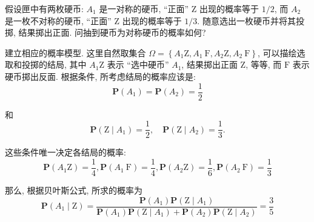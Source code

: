 \begin{example}
    假设匣中有两枚硬币: $A_1$ 是一对称的硬币, “正面” $\mathrm{Z}$ 出现的概率等于 $1 / 2$, 而 $A_2$ 是一枚不对称的硬币, “正面” $\mathrm{Z}$ 出现的概率等于 $1 / 3$. 随意选出一枚硬币并将其投掷, 结果掷出正面. 问抽到硬币为对称硬币的概率如何?
\end{example}

\begin{solution}
    建立相应的概率模型. 这里自然取集合 $\Omega=\left\{A_1 \mathrm{Z}, A_1 \mathrm{~F}, A_2 \mathrm{Z}, A_2 \mathrm{~F}\right\}$, 可以描绘选取和投掷的结局, 其中 $A_1 \mathrm{Z}$ 表示 “选中硬币” $A_1$, 结果掷出正面 $\mathrm{Z}$, 等等, 而 $\mathrm{F}$ 表示硬币掷出反面. 根据条件, 所考虑结局的概率应该是:
$$
\mathbf{P}\left(A_1\right)=\mathbf{P}\left(A_2\right)=\frac{1}{2}
$$

和
$$
\mathbf{P}\left(\mathrm{Z} \mid A_1\right)=\frac{1}{2}, \quad \mathbf{P}\left(\mathrm{Z} \mid A_2\right)=\frac{1}{3} .
$$

这些条件唯一决定各结局的概率:
$$
\mathbf{P}\left(A_1 \mathrm{Z}\right)=\frac{1}{4}, \mathbf{P}\left(A_1 \mathrm{~F}\right)=\frac{1}{4}, \mathbf{P}\left(A_2 \mathrm{Z}\right)=\frac{1}{6}, \mathbf{P}\left(A_2 \mathrm{~F}\right)=\frac{1}{3}
$$

那么, 根据贝叶斯公式, 所求的概率为
$$
\mathbf{P}\left(A_1 \mid \mathrm{Z}\right)=\frac{\mathbf{P}\left(A_1\right) \mathbf{P}\left(\mathrm{Z} \mid A_1\right)}{\mathbf{P}\left(A_1\right) \mathbf{P}\left(\mathrm{Z} \mid A_1\right)+\mathbf{P}\left(A_2\right) \mathbf{P}\left(\mathrm{Z} \mid A_2\right)}=\frac{3}{5}
$$
\end{solution}


